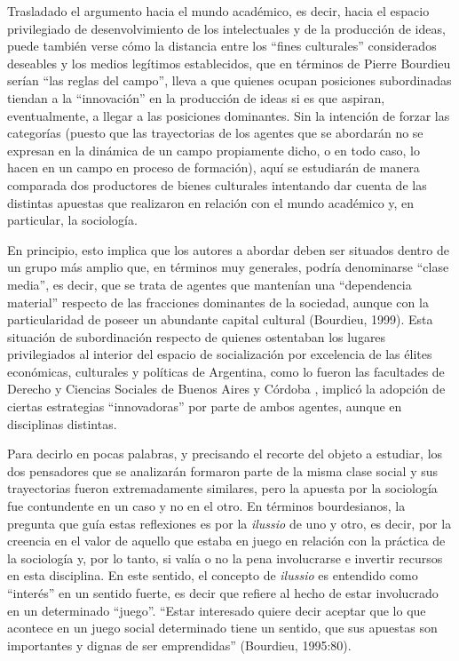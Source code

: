 Trasladado el argumento hacia el mundo académico, es decir, hacia el espacio privilegiado de desenvolvimiento de los intelectuales y de la producción de ideas, puede también verse cómo la distancia entre los \enquote{fines culturales} considerados deseables y los medios legítimos establecidos, que en términos de Pierre Bourdieu serían \enquote{las reglas del campo}, lleva a que quienes ocupan posiciones subordinadas tiendan a la \enquote{innovación} en la producción de ideas si es que aspiran, eventualmente, a llegar a las posiciones dominantes. Sin la intención de forzar las categorías (puesto que las trayectorias de los agentes que se abordarán no se expresan en la dinámica de un campo propiamente dicho, o en todo caso, lo hacen en un campo en proceso de formación), aquí se estudiarán de manera comparada dos productores de bienes culturales intentando dar cuenta de las distintas apuestas que realizaron en relación con el mundo académico y, en particular, la sociología.

En principio, esto implica que los autores a abordar deben ser situados dentro de un grupo más amplio que, en términos muy generales, podría denominarse \enquote{clase media}, es decir, que se trata de agentes que mantenían una \enquote{dependencia material} respecto de las fracciones dominantes de la sociedad, aunque con la particularidad de poseer un abundante capital cultural (Bourdieu, 1999). Esta situación de subordinación respecto de quienes ostentaban los lugares privilegiados al interior del espacio de socialización por excelencia de las élites económicas, culturales y políticas de Argentina, como lo fueron las facultades de Derecho y Ciencias Sociales de Buenos Aires y Córdoba \parencite{277-AGUERO2017,1542-ORTIZ2012}, implicó la adopción de ciertas estrategias \enquote{innovadoras} por parte de ambos agentes, aunque en disciplinas distintas.

Para decirlo en pocas palabras, y precisando el recorte del objeto a estudiar, los dos pensadores que se analizarán formaron parte de la misma clase social y sus trayectorias fueron extremadamente similares, pero la apuesta por la sociología fue contundente en un caso y no en el otro. En términos bourdesianos, la pregunta que guía estas reflexiones es por la \emph{ilussio} de uno y otro, es decir, por la creencia en el valor de aquello que estaba en juego en relación con la práctica de la sociología y, por lo tanto, si valía o no la pena involucrarse e invertir recursos en esta disciplina. En este sentido, el concepto de \emph{ilussio} es entendido como \enquote{interés} en un sentido fuerte, es decir que refiere al hecho de estar involucrado en un determinado \enquote{juego}. \enquote{Estar interesado quiere decir aceptar que lo que acontece en un juego social determinado tiene un sentido, que sus apuestas son importantes y dignas de ser emprendidas} (Bourdieu, 1995:80).

